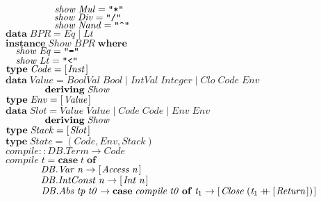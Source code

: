 \documentclass[10pt]{article}
\newcommand{\Conid}[1]{\mathit{#1}}
\newcommand{\Varid}[1]{\mathit{#1}}
\newcommand{\plus}{\mathbin{+\!\!\!+}}
\begin{document}
\begin{hscode}
${\hskip5.00em\relax\Varid{show}\;\Conid{Mul}\mathrel{=}\text{\tt \char34 *\char34}}$\\
${\hskip5.00em\relax\Varid{show}\;\Conid{Div}\mathrel{=}\text{\tt \char34 /\char34}}$\\
${\hskip5.00em\relax\Varid{show}\;\Conid{Nand}\mathrel{=}\text{\tt \char34 \char94 \char34}}$\\
${}$\\
${\mathbf{data}\;\Conid{BPR}\mathrel{=}\Conid{Eq}\mid \Conid{Lt}}$\\
${\mathbf{instance}\;\Conid{Show}\;\Conid{BPR}\;\mathbf{where}}$\\
${\hskip1.00em\relax\Varid{show}\;\Conid{Eq}\mathrel{=}\text{\tt \char34 =\char34}}$\\
${\hskip1.00em\relax\Varid{show}\;\Conid{Lt}\mathrel{=}\text{\tt \char34 <\char34}}$\\
${}$\\
${\mathbf{type}\;\Conid{Code}\mathrel{=}[\mskip1.5mu \Conid{Inst}\mskip1.5mu]}$\\
${\mathbf{data}\;\Conid{Value}\mathrel{=}\Conid{BoolVal}\;\Conid{Bool}\mid \Conid{IntVal}\;\Conid{Integer}\mid \Conid{Clo}\;\Conid{Code}\;\Conid{Env}}$\\
${\hskip4.00em\relax\mathbf{deriving}\;\Conid{Show}}$\\
${\mathbf{type}\;\Conid{Env}\mathrel{=}[\mskip1.5mu \Conid{Value}\mskip1.5mu]}$\\
${\mathbf{data}\;\Conid{Slot}\mathrel{=}\Conid{Value}\;\Conid{Value}\mid \Conid{Code}\;\Conid{Code}\mid \Conid{Env}\;\Conid{Env}}$\\
${\hskip4.00em\relax\mathbf{deriving}\;\Conid{Show}}$\\
${\mathbf{type}\;\Conid{Stack}\mathrel{=}[\mskip1.5mu \Conid{Slot}\mskip1.5mu]}$\\
${\mathbf{type}\;\Conid{State}\mathrel{=}(\Conid{Code},\Conid{Env},\Conid{Stack})}$\\
${\Varid{compile}\mathbin{::}\Conid{\Conid{DB}.Term}\to \Conid{Code}}$\\
${\Varid{compile}\;\Varid{t}\mathrel{=}\mathbf{case}\;\Varid{t}\;\mathbf{of}}$\\
${\phantom{\Varid{compile}\;\mbox{}}\Conid{\Conid{DB}.Var}\;\Varid{n}\to [\mskip1.5mu \Conid{Access}\;\Varid{n}\mskip1.5mu]}$\\
${\phantom{\Varid{compile}\;\mbox{}}\Conid{\Conid{DB}.IntConst}\;\Varid{n}\to [\mskip1.5mu \Conid{Int}\;\Varid{n}\mskip1.5mu]}$\\
${\phantom{\Varid{compile}\;\mbox{}}\Conid{\Conid{DB}.Abs}\;\Varid{tp}\;\Varid{t0}\to \mathbf{case}\;\Varid{compile}\;\Varid{t0}\;\mathbf{of}\;\Varid{t}_{1}\to [\mskip1.5mu \Conid{Close}\;(\Varid{t}_{1}\plus [\mskip1.5mu \Conid{Return}\mskip1.5mu])\mskip1.5mu]}$\\

\end{hscode}
\end{document}
